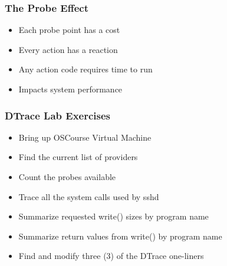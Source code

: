 \documentclass[pdftex]{beamer}
\begin{document}
\begin{frame}
  \frametitle{The Probe Effect}
  \begin{itemize}
  \item Each probe point has a cost
  \item Every action has a reaction
  \item Any action code requires time to run
  \item Impacts system performance
  \end{itemize}
\end{frame}

\begin{frame}
  \frametitle{DTrace Lab Exercises}
  \begin{itemize}
  \item Bring up OSCourse Virtual Machine
  \item Find the current list of providers
  \item Count the probes available
  \item Trace all the system calls used by sshd
  \item Summarize requested write() sizes by program name
  \item Summarize return values from write() by program name
  \item Find and modify three (3) of the DTrace one-liners
  \end{itemize}
\end{frame}
\end{document}
